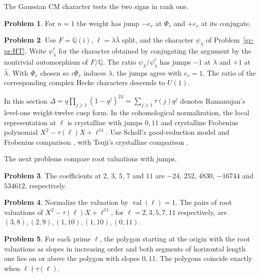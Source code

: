 \documentclass[reqno]{amsart}
\theoremstyle{definition}
\newtheorem{problem}{Problem}[section]
\newcommand{\Q}{\mathbb Q}
\newcommand{\val}{\operatorname{val}}
\newcommand{\ii}{\mathrm i}
\begin{document}
The Gaussian CM character tests the two signs in rank one.

\begin{problem}\label{pr:rank-one}
For \(n=1\) the weight has jump \(-e_v\) at \(\Phi_v\) and \(+e_v\) at its conjugate.
\end{problem}

\begin{problem}\label{pr:cm-sign}
Use \(F=\Q(\ii)\), \(\ell=\lambda\bar\lambda\) split, and the character \(\psi_\lambda\) of Problem~\ref{gr-pr:HT}.  Write \(\psi_\lambda^c\) for the character obtained by conjugating the argument by the nontrivial automorphism of \(F/\Q\).  The ratio \(\psi_\lambda/\psi_\lambda^c\) has jumps \(-1\) at \(\lambda\) and \(+1\) at \(\bar\lambda\).  With \(\Phi_v\) chosen so \(\iota\Phi_v\) induces \(\lambda\), the jumps agree with \(e_v=1\).  The ratio of the corresponding complex Hecke characters descends to \(U(1)\).
\end{problem}

In this section \(\Delta=q\prod_{j\ge1}(1-q^j)^{24}=\sum_{j\ge1}\tau(j)q^j\) denotes Ramanujan’s level-one weight-twelve cusp form.  In the cohomological normalization, the local representation at \(\ell\) is crystalline with jumps \(0,11\) and crystalline Frobenius polynomial \(X^2-\tau(\ell)X+\ell^{11}\).  Use Scholl's good-reduction model and Frobenius comparison \cite{Sch}, with Tsuji's crystalline comparison \cite{Ts}.

The next problems compare root valuations with jumps.

\begin{problem}\label{pr:tau}
The coefficients at \(2\), \(3\), \(5\), \(7\) and \(11\) are \(-24\), \(252\), \(4830\), \(-16744\) and \(534612\), respectively.
\end{problem}

\begin{problem}\label{pr:slopes}
Normalize the valuation by \(\val(\ell)=1\).  The pairs of root valuations of \(X^2-\tau(\ell)X+\ell^{11}\), for \(\ell=2,3,5,7,11\) respectively, are \((3,8),(2,9),(1,10),(1,10),(0,11)\).
\end{problem}

\begin{problem}\label{pr:polygon}
For each prime \(\ell\), the polygon starting at the origin with the root valuations as slopes in increasing order and both segments of horizontal length one lies on or above the polygon with slopes \(0,11\).  The polygons coincide exactly when \(\ell\nmid\tau(\ell)\).
\end{problem}
\end{document}
